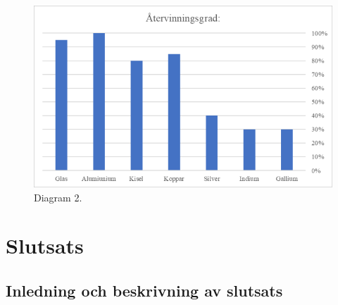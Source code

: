 \documentclass{article}
\begin{document}




\begin{figure}[h]
	\centering
	\includegraphics[width=\linewidth]{diagram2}
	\caption{Diagram 2.}
	\label{fig:dig2}
\end{figure}
\pagebreak
\section{Slutsats}

\subsection{Inledning och beskrivning av slutsats}

\end{document}
